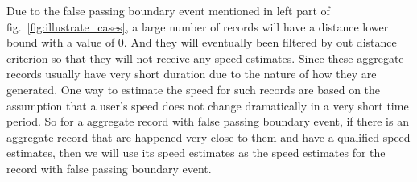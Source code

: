 Due to the false passing boundary event mentioned in left part of fig.~\ref{fig:illustrate_cases}, a large number of records will have a distance lower bound with a value of $0$. And they will eventually been filtered by out distance criterion so that they will not receive any speed estimates. Since these aggregate records usually have very short duration due to the nature of how they are generated. One way to estimate the speed for such records are based on the assumption that a user's speed does not change dramatically in a very short time period. So for a aggregate record with false passing boundary event, if there is an aggregate record that are happened very close to them and have a qualified speed estimates, then we will use its speed estimates as the speed estimates for the record with false passing boundary event.
